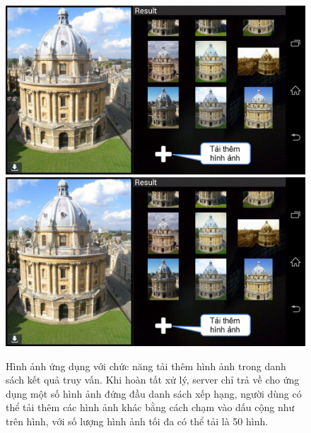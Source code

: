 \begin{figure}[!htbp]
  \begin{center}
    \leavevmode
    \ifpdf
      \includegraphics[scale=0.36]{interface_5}
    \else
      \includegraphics[scale=0.36]{interface_5}
    \fi
    \caption[Hình ảnh ứng dụng với chức năng tải thêm hình ảnh trong danh sách kết quả]{Hình ảnh ứng dụng với chức năng tải thêm hình ảnh trong danh sách kết quả truy vấn. Khi hoàn tất xử lý, server chỉ trả về cho ứng dụng một số hình ảnh đứng đầu danh sách xếp hạng, người dùng có thể tải thêm các hình ảnh khác bằng cách chạm vào dấu cộng như trên hình, với số lượng hình ảnh tối đa có thể tải là 50 hình.}
    \label{FigInterface5}
  \end{center}
\end{figure}

